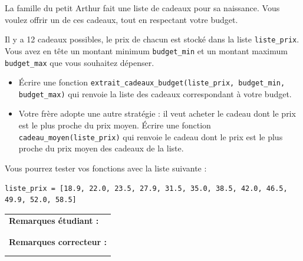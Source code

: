 \documentclass[a4paper,11pt]{article}
\begin{document}
La famille du petit Arthur fait une liste de cadeaux pour sa naissance. Vous voulez offrir un de ces cadeaux, tout en respectant votre budget.

\medskip

Il y a 12 cadeaux possibles, le prix de chacun est stocké dans la liste \texttt{liste\_prix}. Vous avez en tête un montant minimum \texttt{budget\_min} et un montant maximum \texttt{budget\_max} que vous souhaitez dépenser.

\begin{itemize}
\item[1.] Écrire une fonction 
\texttt{extrait\_cadeaux\_budget(liste\_prix, budget\_min, budget\_max)} qui renvoie la liste des cadeaux correspondant à votre budget.
\item[2.] Votre frère adopte une autre stratégie : il veut acheter le cadeau dont le prix est le plus proche du prix moyen. Écrire une fonction \texttt{cadeau\_moyen(liste\_prix)} qui renvoie le cadeau dont le prix est le plus proche du prix moyen des cadeaux de la liste.
\end{itemize}

\bigskip

Vous pourrez tester vos fonctions avec la liste suivante :
\begin{verbatim}
liste_prix = [18.9, 22.0, 23.5, 27.9, 31.5, 35.0, 38.5, 42.0, 46.5, 49.9, 52.0, 58.5]
\end{verbatim}
\vspace*{0.5 cm}
\begin{table}[h!]
\centering
\renewcommand{\arraystretch}{1.4} %
\begin{tabular}{|p{15cm}|}
\hline
\textbf{Remarques étudiant :}    \\
 \\
 \\
\hline
\textbf{Remarques correcteur :}  \\
 \\
 \\
\hline
\end{tabular}
\end{table}
\end{document}
